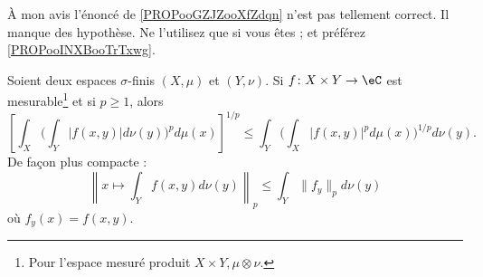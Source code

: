 À mon avis l'énoncé de \ref{PROPooGZJZooXfZdqn} n'est pas tellement correct. Il manque des hypothèse. Ne l'utilisez que si vous êtes ; et préférez \ref{PROPooINXBooTrTxwg}.
\begin{proposition}     \label{PROPooGZJZooXfZdqn}		%
	Soient deux espaces \( \sigma\)-finis \( (X,\mu)\) et \( (Y,\nu)\). Si \( f\colon X\times Y\to \eC\) est mesurable\footnote{Pour l'espace mesuré produit \(  X\times Y, \mu\otimes \nu\).} et si \( p\geq 1\), alors
	\begin{equation}        \label{EQooAEXWooYJtGGR}
		\left[ \int_X\Big( \int_Y| f(x,y) |d\nu(y) \Big)^pd\mu(x) \right]^{1/p}\leq \int_Y\Big( \int_X| f(x,y) |^pd\mu(x) \Big)^{1/p}d\nu(y).
	\end{equation}
	De façon plus compacte :
	\begin{equation}
		\left\|   x\mapsto\int_Y f(x,y)d\nu(y)   \right\|_p\leq \int_Y  \| f_y \|_pd\nu(y)
	\end{equation}
	où \( f_y(x)=f(x,y)\).
\end{proposition}

